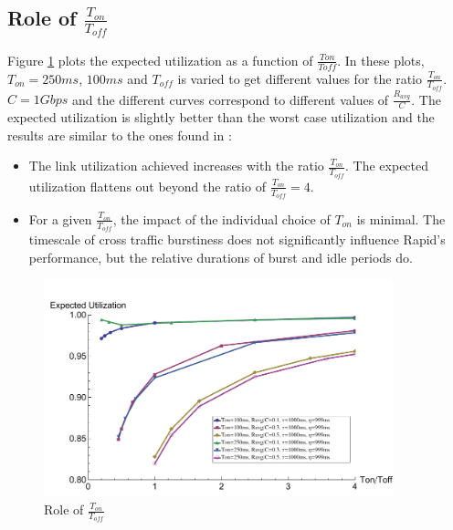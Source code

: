   \subsection{Role of $\frac{T_{on}}{T_{off}}$}
    Figure \ref{rtttontoff} plots the expected utilization as a function of 
    $\frac{Ton}{Toff}$. In these plots, $T_{on} = 250ms$, $100ms$ and 
    $T_{off}$ is varied to get different values for the ratio 
    $\frac{T_{on}}{T_{off}}$. $C = 1Gbps$ and the different curves correspond 
    to different values of $\frac{R_{avg}}{C}$. The expected utilization is 
    slightly better than the worst case utilization and the results are 
    similar to the ones found in \cite{Lovewell2011-Noise-TR}:
    \begin{itemize}
      \item The link utilization achieved increases with the ratio 
      $\frac{T_{on}}{T_{off}}$. The expected utilization flattens out beyond 
      the ratio of $\frac{T_{on}}{T_{off}} = 4$.
      \item For a given $\frac{T_{on}}{T_{off}}$, the impact of the 
      individual choice of $T_{on}$ is minimal. The timescale of cross traffic 
      burstiness does not significantly influence Rapid's performance, but the 
      relative durations of burst and idle periods do.
    \end{itemize}
    \begin{figure}[h]
      \centering
      \includegraphics[width=0.9\textwidth]{img/rtttontoff.pdf}
      \caption{Role of $\frac{T_{on}}{T_{off}}$}
      \label{rtttontoff}
    \end{figure}

